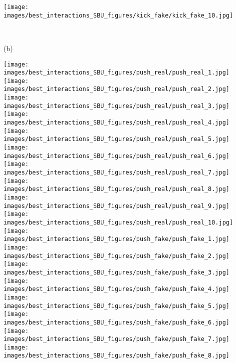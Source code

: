 \documentclass[times,twocolumn,final]{elsarticle}
\begin{document}
\begin{figure*}
\begin{minipage}{0.9\textwidth}
  \hfill 
  \texttt{[image: images/best\_interactions\_SBU\_figures/kick\_fake/kick\_fake\_10.jpg]}
  \hfill 
    \end{minipage}\\
    \begin{minipage}{0.08\textwidth}
       (b)\quad{}%
    \end{minipage}
    \begin{minipage}{0.9\textwidth}
  \texttt{[image: images/best\_interactions\_SBU\_figures/push\_real/push\_real\_1.jpg]}
  \hfill
  \texttt{[image: images/best\_interactions\_SBU\_figures/push\_real/push\_real\_2.jpg]}
  \hfill
  \texttt{[image: images/best\_interactions\_SBU\_figures/push\_real/push\_real\_3.jpg]}
  \hfill
  \texttt{[image: images/best\_interactions\_SBU\_figures/push\_real/push\_real\_4.jpg]}
  \hfill
  \texttt{[image: images/best\_interactions\_SBU\_figures/push\_real/push\_real\_5.jpg]}
  \hfill
  \texttt{[image: images/best\_interactions\_SBU\_figures/push\_real/push\_real\_6.jpg]}
  \hfill
  \texttt{[image: images/best\_interactions\_SBU\_figures/push\_real/push\_real\_7.jpg]}
  \hfill
  \texttt{[image: images/best\_interactions\_SBU\_figures/push\_real/push\_real\_8.jpg]}
  \hfill
  \texttt{[image: images/best\_interactions\_SBU\_figures/push\_real/push\_real\_9.jpg]}
  \hfill
  \texttt{[image: images/best\_interactions\_SBU\_figures/push\_real/push\_real\_10.jpg]}
  \hfill \\
  \texttt{[image: images/best\_interactions\_SBU\_figures/push\_fake/push\_fake\_1.jpg]}
  \hfill
  \texttt{[image: images/best\_interactions\_SBU\_figures/push\_fake/push\_fake\_2.jpg]}
  \hfill
  \texttt{[image: images/best\_interactions\_SBU\_figures/push\_fake/push\_fake\_3.jpg]}
  \hfill
  \texttt{[image: images/best\_interactions\_SBU\_figures/push\_fake/push\_fake\_4.jpg]}
  \hfill
  \texttt{[image: images/best\_interactions\_SBU\_figures/push\_fake/push\_fake\_5.jpg]}
  \hfill
  \texttt{[image: images/best\_interactions\_SBU\_figures/push\_fake/push\_fake\_6.jpg]}
  \hfill
  \texttt{[image: images/best\_interactions\_SBU\_figures/push\_fake/push\_fake\_7.jpg]}
  \hfill
  \texttt{[image: images/best\_interactions\_SBU\_figures/push\_fake/push\_fake\_8.jpg]}

\end{minipage}
\end{figure*}
\end{document}
